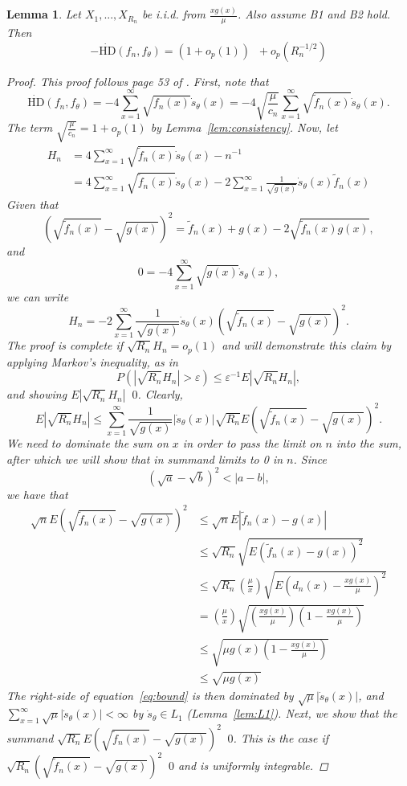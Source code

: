 \documentclass[11 pt]{article}
\newtheorem{lem}{Lemma}
\renewcommand{\th}{\theta}
\newcommand{\xra}[1]{\mathop{ \xrightarrow{#1} }}
\newcommand{\fp}[1]{ \mathop{ \left( #1 \right) } }
\newcommand{\fb}[1]{ \mathop{ \left[ #1 \right] } }
\newcommand{\hell}{\text{HD}}
\newcommand{\dhell}{\dot{\hell}}
\newcommand{\gs}{\frac{xg(x)}{\mu}}
\newcommand{\fnt}{\tilde{f}_n(x)}
\newcommand{\dsth}{\dot{s}_{\theta}}
\newcommand{\fthnx}{f_{\th}}
\begin{document}
\begin{lem}
Let $X_1,...,X_{R_n}$ be i.i.d. from $\gs$. Also assume B1 and B2 hold. Then
\[
-\dhell(f_n,\fthnx) = (1 + o_p(1))\fp{ R_n^{-1} \fb{2 \mu \sum_{i=1}^{R_n} \frac{1}{\sqrt{g(X_i)}} \dot{s}_{\theta}(X_i)  X_i^{-1}}} + o_p(R_n^{-1/2})
\]
\label{lem:two}
\begin{proof}
This proof follows page 53 of \cite{disparity}. First, note that
\[
\dhell(f_n,\fthnx) = -4 \sum_{x=1}^{\infty} \sqrt{f_n(x)} \dsth(x) = -4 \sqrt{ \frac{\mu}{c_n}} \sum_{x=1}^{\infty} \sqrt{\fnt} \dsth(x) .
\]
The term $\sqrt{\frac{\mu}{c_n}} = 1 + o_p(1)$ by Lemma~\ref{lem:consistency}. Now, let
\begin{align*}
H_n &= 4 \sum_{x=1}^{\infty} \sqrt{\fnt} \dsth(x) - n^{-1} \fb{2 \mu \sum_{i=1}^{R_n} \frac{1}{\sqrt{ g(X_i)}} \dot{s}_{\theta}(X_i)  X_i^{-1}} \\
&= 4 \sum_{x=1}^{\infty} \sqrt{\fnt} \dsth(x) - 2 \sum_{x=1}^{\infty} \frac{1}{\sqrt{g(x)}} \dot{s}_{\theta}(x)  \fnt 
\end{align*}
Given that
\[
\left ( \sqrt{\fnt} - \sqrt{g(x)} \right ) ^2 = \fnt + g(x) - 2\sqrt{\fnt g(x)},
\]
and
\[
0 = -4 \sum_{x=1}^{\infty} \sqrt{g(x)} \dsth(x),
\]
we can write
\[
H_n = -2 \sum_{x=1}^{\infty} \frac{1}{\sqrt{g(x)}} \dsth(x) \left ( \sqrt{\fnt} - \sqrt{g(x)} \right )^2.
\]
The proof is complete if $\sqrt{R_n}H_n = o_p(1)$ and will demonstrate this claim by applying Markov's inequality, as in 
\[
P(|\sqrt{R_n}H_n| > \varepsilon) \leq \varepsilon^{-1} E|\sqrt{R_n}H_n|,
\]
and showing $E|\sqrt{R_n}H_n| \xra{n \rightarrow \infty} 0$. Clearly,
\begin{equation}
E|\sqrt{R_n}H_n| \leq  \sum_{x=1}^{\infty} \frac{1}{\sqrt{g(x)}} |\dsth(x)| \sqrt{R_n} E \left ( \sqrt{\fnt} - \sqrt{g(x)} \right )^2. \label{eq:bound}
\end{equation}
We need to dominate the sum on $x$ in order to pass the limit on $n$ into the sum, after which we will show that in summand limits to 0 in $n$. Since 
\begin{equation}
(\sqrt{a} - \sqrt{b})^2 < |a-b|, \label{eq:boundtwo}
\end{equation}
we have that
\begin{align*}
\sqrt{n} E \left ( \sqrt{\fnt} - \sqrt{g(x)} \right )^2 &\leq \sqrt{n} E|\fnt - g(x)| \\
&\leq \sqrt{R_n} \sqrt{E(\fnt - g(x))^2} \\
&\leq \sqrt{R_n} \left (\frac{\mu}{x} \right ) \sqrt{E \left (d_n(x) - \gs \right )^2 }\\
&=  \left (\frac{\mu}{x} \right ) \sqrt{\left( \gs \right) \left( 1-\gs \right) } \\
&\leq  \sqrt{\mu  g(x)  \left( 1-\gs \right) } \\
&\leq \sqrt{\mu  g(x) }
\end{align*}
The right-side of equation~\eqref{eq:bound} is then dominated by $\sqrt{\mu} |\dsth(x)|$, and $\sum_{x=1}^{\infty}  \sqrt{\mu} |\dsth(x)| < \infty$ by $\dsth \in L_1$ (Lemma~\ref{lem:L1}). Next, we show that the summand $\sqrt{R_n} E \left ( \sqrt{\fnt} - \sqrt{g(x)} \right )^2 \xra{n \rightarrow \infty} 0 $. This is the case if $\sqrt{R_n} \left ( \sqrt{\fnt} - \sqrt{g(x)} \right )^2 \xra{p} 0$ and is uniformly integrable.


\end{proof}
\end{lem}
\end{document}

